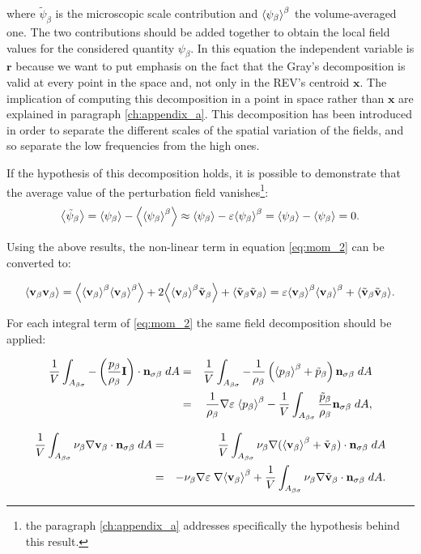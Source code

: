 \noindent where $\tilde{\psi}_{\beta}$ is the microscopic scale contribution and $ {\left< \psi_{\beta} \right>}^{\beta}$ the volume-averaged one. The two contributions should be added together to obtain the local field values for the considered quantity $\psi_{\beta}$.
In this equation the independent variable is $\mathbf{r}$ because we want to put emphasis on the fact that the Gray's decomposition is valid at every point in the space and, not only in the REV's centroid $\mathbf{x}$. The implication of computing this decomposition in a point in space rather than $\mathbf{x}$ are explained in paragraph \ref{ch:appendix_a}.
This decomposition has been introduced in order to separate the different scales of the spatial variation of the fields, and so separate the low frequencies from the high ones.

If the hypothesis of this decomposition holds, it is possible to demonstrate that the average value of the perturbation field vanishes\footnote{the paragraph \ref{ch:appendix_a} addresses specifically the hypothesis behind this result.}:
$$
{\left< \tilde{\psi}_{\beta} \right>} = {\left< \psi_{\beta} \right>} - {\left< {\left< \psi_{\beta} \right>}^{\beta} \right>} \approx {\left< \psi_{\beta} \right>} -\varepsilon {\left< \psi_{\beta} \right>}^{\beta} = {\left< \psi_{\beta} \right>} -{\left< \psi_{\beta} \right>} = 0.
$$


Using the above results, the non-linear term in equation \eqref{eq:mom_2} can be converted to:

\begin{equation}
{\left< \textbf{v}_{\beta}\textbf{v}_{\beta}\right>} = {\left< {\left< \textbf{v}_{\beta} \right>}^{\beta}{\left< \textbf{v}_{\beta} \right>}^{\beta} \right>} +2{\left< {\left< \textbf{v}_{\beta} \right>}^{\beta}\tilde{\textbf{v}}_{\beta} \right>} +{\left< \tilde{\textbf{v}}_{\beta} \tilde{\textbf{v}}_{\beta} \right>} = \varepsilon {\left< \textbf{v}_{\beta}\right>}^{\beta}{\left< \textbf{v}_{\beta} \right>}^{\beta} +{\left< \tilde{\textbf{v}}_{\beta}\tilde{\textbf{v}}_{\beta} \right>}.
\label{eq:dec_1}
\end{equation}

For each integral term of \eqref{eq:mom_2} the same field decomposition should be applied:

\begin{eqnarray}
\dfrac{1}{V} \int_{A_{\beta \sigma}}  - \left( \dfrac{p_{\beta}}{\rho_{\beta}} \mathbf{I} \right) \cdot \mathbf{n}_{\sigma \beta} \;dA &=& \dfrac{1}{V} \int_{A_{\beta \sigma}}  -\dfrac{1}{\rho_{\beta}} \left({\left< p_{\beta} \right>}^{\beta}   + \tilde{p}_{\beta} \right)  \mathbf{n}_{\sigma \beta} \;dA  \nonumber \\
&=& \dfrac{1}{\rho_{\beta}}\nabla\varepsilon \; {\left< p_{\beta} \right>}^{\beta} - \dfrac{1}{V} \int_{A_{\beta \sigma}}  \dfrac{\tilde{p}_{\beta}}{\rho_{\beta}}  \mathbf{n}_{\sigma \beta} \;dA,
\end{eqnarray}


\begin{eqnarray}
\dfrac{1}{V} \int_{A_{\beta \sigma}} \nu_{\beta} \nabla \textbf{v}_{\beta} \cdot \mathbf{n}_{\sigma \beta} \;dA &=& \dfrac{1}{V} \int_{A_{\beta \sigma}} \nu_{\beta} \nabla ({\left< \textbf{v}_{\beta} \right>}^{\beta} +\tilde{\textbf{v}}_{\beta}) \cdot \mathbf{n}_{\sigma \beta} \;dA   \nonumber \\
&=& - \nu_{\beta} \nabla \varepsilon \; \nabla {\left< \textbf{v}_{\beta}\right>}^{\beta} + \dfrac{1}{V} \int_{A_{\beta \sigma}} \nu_{\beta} \nabla \tilde{\textbf{v}}_{\beta} \cdot \mathbf{n}_{\sigma \beta} \;dA.
\end{eqnarray}

